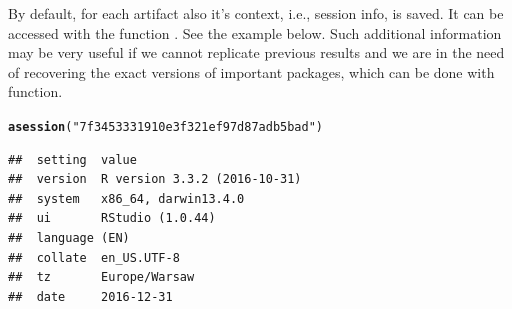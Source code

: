 \documentclass[nojss]{jss}\usepackage[]{graphicx}\usepackage[]{color}
\makeatletter
\newcommand{\hlstr}[1]{\textcolor[rgb]{0.192,0.494,0.8}{#1}}%
\newcommand{\hlstd}[1]{\textcolor[rgb]{0.345,0.345,0.345}{#1}}%
\newcommand{\hlkwd}[1]{\textcolor[rgb]{0.737,0.353,0.396}{\textbf{#1}}}%
\newenvironment{kframe}{%
 \def\at@end@of@kframe{}%
 \ifinner\ifhmode%
  \def\at@end@of@kframe{\end{minipage}}%
  \begin{minipage}{\columnwidth}%
 \fi\fi%
 \def\FrameCommand##1{\hskip\@totalleftmargin \hskip-\fboxsep
 \colorbox{shadecolor}{##1}\hskip-\fboxsep
     \hskip-\linewidth \hskip-\@totalleftmargin \hskip\columnwidth}%
 \MakeFramed {\advance\hsize-\width
   \@totalleftmargin\z@ \linewidth\hsize
   \@setminipage}}%
 {\par\unskip\endMakeFramed%
 \at@end@of@kframe}
\newenvironment{knitrout}{}{} %
\makeatother
\begin{document}

By default, for each artifact also it's context, i.e., session info, is saved. It can be accessed with the function . See the example below. Such additional information may be very useful if we cannot replicate previous results and we are in the need of recovering the exact versions of important packages, which can be done with  function.

\begin{knitrout}
\color{fgcolor}\begin{kframe}
\begin{alltt}
\hlkwd{asession}\hlstd{(}\hlstr{"7f3453331910e3f321ef97d87adb5bad"}\hlstd{)}
\end{alltt}


{\ttfamily\noindent\itshape\color{messagecolor}{\#\# Session info ---------------------------------------------------------}}\begin{verbatim}
##  setting  value                       
##  version  R version 3.3.2 (2016-10-31)
##  system   x86_64, darwin13.4.0        
##  ui       RStudio (1.0.44)            
##  language (EN)                        
##  collate  en_US.UTF-8                 
##  tz       Europe/Warsaw               
##  date     2016-12-31
\end{verbatim}



\end{kframe}
\end{knitrout}
\end{document}

